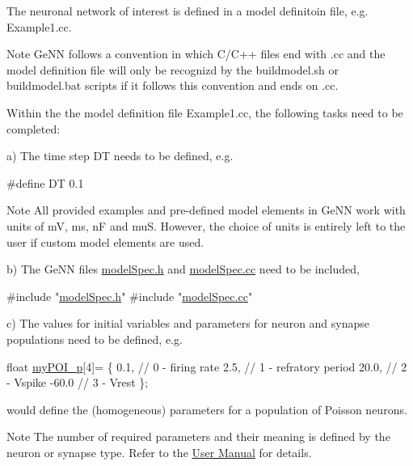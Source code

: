\begin{DoxyEnumerate}
\item The neuronal network of interest is defined in a model definitoin file, e.\+g. {\ttfamily Example1.\+cc}. \begin{DoxyNote}{Note}
Ge\+N\+N follows a convention in which C/\+C++ files end with {\ttfamily .cc} and the model definition file will only be recognizd by the {\ttfamily buildmodel.\+sh} or {\ttfamily buildmodel.\+bat} scripts if it follows this convention and ends on {\ttfamily .cc}.
\end{DoxyNote}

\item Within the the model definition file {\ttfamily Example1.\+cc}, the following tasks need to be completed\+:

a) The time step {\ttfamily D\+T} needs to be defined, e.\+g. 
\begin{DoxyCode}
\textcolor{preprocessor}{#define DT 0.1}
\end{DoxyCode}
 \begin{DoxyNote}{Note}
All provided examples and pre-\/defined model elements in Ge\+N\+N work with units of m\+V, ms, n\+F and mu\+S. However, the choice of units is entirely left to the user if custom model elements are used.
\end{DoxyNote}
b) The Ge\+N\+N files {\ttfamily \hyperlink{modelSpec_8h}{model\+Spec.\+h}} and {\ttfamily \hyperlink{modelSpec_8cc}{model\+Spec.\+cc}} need to be included, 
\begin{DoxyCode}
\textcolor{preprocessor}{#include "\hyperlink{modelSpec_8h}{modelSpec.h}"}
\textcolor{preprocessor}{#include "\hyperlink{modelSpec_8cc}{modelSpec.cc}"}
\end{DoxyCode}
 c) The values for initial variables and parameters for neuron and synapse populations need to be defined, e.\+g. 
\begin{DoxyCode}
\textcolor{keywordtype}{float} \hyperlink{tmp_2model_2MBody__userdef_8cc_aa8fe3267f630659c3634841347ae2e09}{myPOI\_p}[4]= \{
  0.1,        \textcolor{comment}{// 0 - firing rate}
  2.5,        \textcolor{comment}{// 1 - refratory period}
  20.0,       \textcolor{comment}{// 2 - Vspike}
  -60.0       \textcolor{comment}{// 3 - Vrest}
\};
\end{DoxyCode}
 would define the (homogeneous) parameters for a population of Poisson neurons. \begin{DoxyNote}{Note}
The number of required parameters and their meaning is defined by the neuron or synapse type. Refer to the \hyperlink{}{User Manual} for details. ~\newline

\end{DoxyNote}
\end{DoxyEnumerate}

